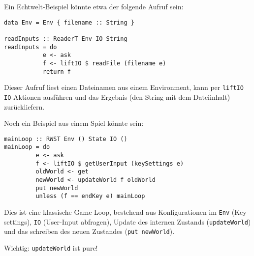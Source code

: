 \documentclass{beamer}
\begin{document}
\begin{frame}[fragile]
Ein Echtwelt-Beispiel könnte etwa der folgende Aufruf sein:\bigskip

\begin{verbatim}
data Env = Env { filename :: String }

readInputs :: ReaderT Env IO String
readInputs = do
           e <- ask
           f <- liftIO $ readFile (filename e)
           return f
\end{verbatim}
\pause
Dieser Aufruf liest einen Dateinamen aus einem Environment, kann per \texttt{liftIO} \texttt{IO}-Aktionen ausführen und das Ergebnis (den String mit dem Dateiinhalt) zurückliefern.
\end{frame}

\begin{frame}[fragile]
Noch ein Beispiel aus einem Spiel könnte sein:\smallskip

\begin{verbatim}
mainLoop :: RWST Env () State IO ()
mainLoop = do
         e <- ask
         f <- liftIO $ getUserInput (keySettings e)
         oldWorld <- get
         newWorld <- updateWorld f oldWorld
         put newWorld
         unless (f == endKey e) mainLoop
\end{verbatim}
\bigskip

\pause
Dies ist eine klassische Game-Loop, bestehend aus Konfigurationen im \texttt{Env} (Key settings), \texttt{IO} (User-Input abfragen), Update des internen Zustands (\texttt{updateWorld}) und das schreiben des neuen Zustandes (\texttt{put newWorld}).\smallskip

\pause
Wichtig: \texttt{updateWorld} ist pure!
\end{frame}
\end{document}
